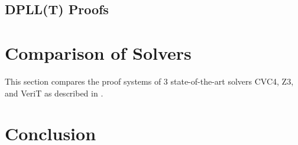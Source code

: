 \documentclass{report}
\begin{document}
\subsection{DPLL(T) Proofs}
\label{sec:dplltproofs}

\section{Comparison of Solvers}
\label{sec:comp}
This section compares the proof systems of 3 state-of-the-art 
solvers CVC4, Z3, and VeriT as described in .

\section{Conclusion}
\label{sec:conc}



\end{document}
